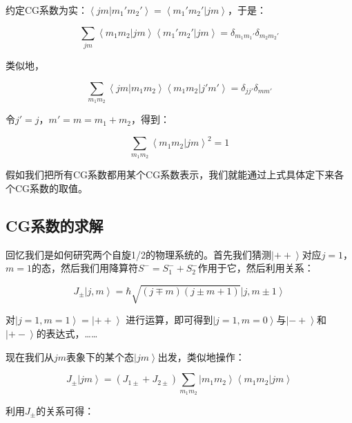 约定CG系数为实：$ \left\langle jm | m_1' m_2' \right\rangle  = \left\langle  m_1' m_2' | jm \right\rangle $，于是：

\begin{equation}
\sum\limits_{jm}  \left\langle m_1 m_2 | j m \right\rangle \left\langle m_1' m_2' | j m \right\rangle = \delta_{m_1 m_1' } \delta_{ m_2 m_2'} 
\end{equation}

类似地，

\begin{equation}
\sum\limits_{m_1 m_2}  \left\langle jm | m_1 m_2 \right\rangle \left\langle m_1 m_2 | j' m' \right\rangle = \delta_{jj' } \delta_{ mm'} 
\end{equation}

令$j' = j$，$m' = m = m_1 + m_2  $，得到：

\begin{equation}
\sum\limits_{m_1 m_2} \left\langle m_1 m_2 | j m \right\rangle^2 = 1
\end{equation}

假如我们把所有CG系数都用某个CG系数表示，我们就能通过上式具体定下来各个CG系数的取值。

\subsection{CG系数的求解}

回忆我们是如何研究两个自旋1/2的物理系统的。首先我们猜测$\left| ++ \right\rangle$对应$j=1$，$m=1$的态，然后我们用降算符$S^- = S_1^- + S_2^-$作用于它，然后利用关系：

\begin{equation}
J_{\pm} \left| j,m \right\rangle = \hbar \sqrt{ (j \mp m ) ( j \pm m + 1 ) } \left| j,m \pm 1 \right\rangle
\end{equation}

对$\left| j=1, m=1  \right\rangle = \left|  +  +  \right\rangle$ 进行运算，即可得到$\left| j = 1, m=0  \right\rangle $与$\left|  -  +  \right\rangle$和$\left|  +  -  \right\rangle$的表达式，……

现在我们从$jm$表象下的某个态$\left| jm \right\rangle$出发，类似地操作：

\begin{equation}
J_{\pm} \left| jm \right\rangle = (J_{1 \pm} + J_{2 \pm}) \sum\limits_{m_1 m_2} \left| m_1 m_2  \right\rangle \left\langle m_1 m_2 | jm \right\rangle
\end{equation}

利用$J_{\pm}$的关系可得：

